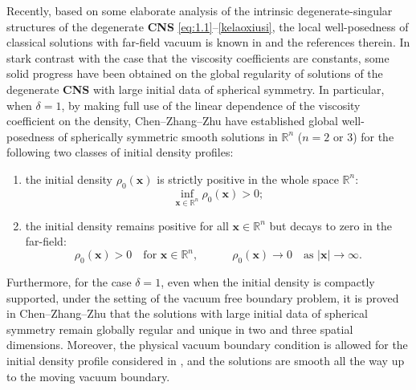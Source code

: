\documentclass[11pt,reqno]{amsart}
\numberwithin{rk}{section}
\numberwithin{prop}{section}
\numberwithin{mydef}{section}
\numberwithin{lem}{section}
\numberwithin{equation}{section}
\numberwithin{thm}{section}
\begin{document}
Recently, based on some elaborate analysis of the intrinsic degenerate-singular structures of the degenerate \textbf{CNS} \eqref{eq:1.1}--\eqref{kelaoxiusi}, the local well-posedness of classical solutions with far-field vacuum is known in  \cite{GG, sz3,sz333,zhuthesis} and the references therein. In stark contrast with the case that the viscosity coefficients are constants, some solid progress have been obtained on the global regularity of solutions of the degenerate \textbf{CNS} with large initial data of spherical symmetry.
In particular, when $\delta=1$, by making full use of the linear dependence of the viscosity coefficient on the density,
Chen--Zhang--Zhu \cite{CZZ1} have established global well-posedness of spherically symmetric smooth solutions  in $\mathbb{R}^n$ ($n=2$ or $3$) for the following two classes of initial density profiles{\rm:}
 \begin{enumerate}
\item[\rm{(i)}] the initial density $\rho_0(\boldsymbol{x})$ is strictly positive in the whole space $\mathbb{R}^n$: 
\begin{equation*}
\inf_{\boldsymbol{x}\in \mathbb{R}^n} \rho_0(\boldsymbol{x})>0;
\end{equation*}
\item[\rm{(ii)}] the initial density remains positive for all $\boldsymbol{x}\in \mathbb{R}^n$  but decays to zero in the far-field:
\begin{equation*}
\rho_0(\boldsymbol{x}) >0 \quad \text{for $\boldsymbol{x}\in \mathbb{R}^n$},  \qquad\quad\rho_0(\boldsymbol{x}) \to 0 \quad \text{as $|\boldsymbol{x}|\to \infty$}.      
\end{equation*}
\end{enumerate}
Furthermore, for the case  $\delta=1$, 
even when the initial density is compactly supported, 
under the setting of the vacuum free boundary problem, 
it is proved in  Chen--Zhang--Zhu \cite{CZZ2} that 
the solutions with large initial data of spherical symmetry remain globally regular and unique in two and three spatial dimensions. Moreover,  the physical vacuum boundary condition is allowed for the initial density profile considered in \cite{CZZ2}, and the solutions are smooth all the way up to the moving vacuum boundary.
\end{document}
